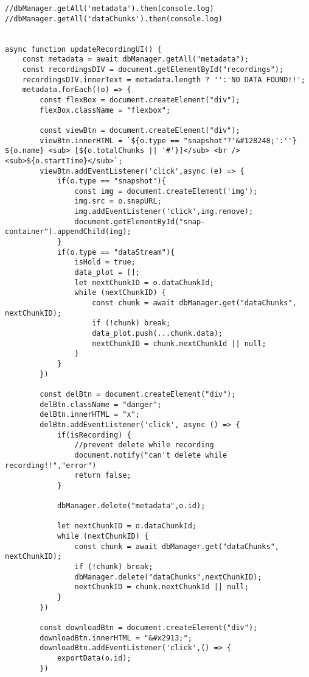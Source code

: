 \begin{lstlisting}[style=htmlcssjs]
//dbManager.getAll('metadata').then(console.log)
//dbManager.getAll('dataChunks').then(console.log)


async function updateRecordingUI() {
    const metadata = await dbManager.getAll("metadata");
    const recordingsDIV = document.getElementById("recordings");
    recordingsDIV.innerText = metadata.length ? '':'NO DATA FOUND!!';
    metadata.forEach((o) => {
        const flexBox = document.createElement("div");
        flexBox.className = "flexbox";
        
        const viewBtn = document.createElement("div");
        viewBtn.innerHTML = `${o.type == "snapshot"?'&#128248;':''} ${o.name} <sub> [${o.totalChunks || '#'}]</sub> <br /><sub>${o.startTime}</sub>`; 
        viewBtn.addEventListener('click',async (e) => {
            if(o.type == "snapshot"){
                const img = document.createElement('img');
                img.src = o.snapURL;
                img.addEventListener('click',img.remove);
                document.getElementById("snap-container").appendChild(img);
            }
            if(o.type == "dataStream"){
                isHold = true;
                data_plot = [];
                let nextChunkID = o.dataChunkId;
                while (nextChunkID) {
                    const chunk = await dbManager.get("dataChunks", nextChunkID);
                    if (!chunk) break;
                    data_plot.push(...chunk.data);
                    nextChunkID = chunk.nextChunkId || null;
                }
            }
        })
        
        const delBtn = document.createElement("div");
        delBtn.className = "danger";
        delBtn.innerHTML = "x";
        delBtn.addEventListener('click', async () => {
            if(isRecording) {
                //prevent delete while recording
                document.notify("can't delete while recording!!","error")
                return false;
            }
            
            dbManager.delete("metadata",o.id);
            
            let nextChunkID = o.dataChunkId;
            while (nextChunkID) {
                const chunk = await dbManager.get("dataChunks", nextChunkID);
                if (!chunk) break;
                dbManager.delete("dataChunks",nextChunkID);
                nextChunkID = chunk.nextChunkId || null;
            }
        })
        
        const downloadBtn = document.createElement("div");
        downloadBtn.innerHTML = "&#x2913;";
        downloadBtn.addEventListener('click',() => {
            exportData(o.id);
        })
        

\end{lstlisting}
